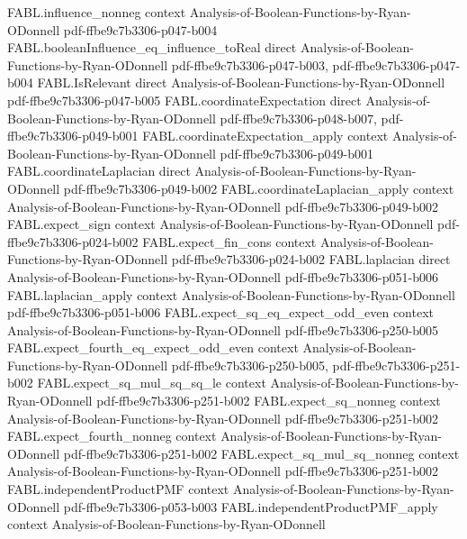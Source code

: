 \begin{theorem}
  {FABL.influence_nonneg}
  {context}
  {Analysis-of-Boolean-Functions-by-Ryan-ODonnell}
  {pdf-ffbe9c7b3306-p047-b004}
\proofstep
  {FABL.booleanInfluence_eq_influence_toReal}
  {direct}
  {Analysis-of-Boolean-Functions-by-Ryan-ODonnell}
  {pdf-ffbe9c7b3306-p047-b003,
    pdf-ffbe9c7b3306-p047-b004}
\proofstep
  {FABL.IsRelevant}
  {direct}
  {Analysis-of-Boolean-Functions-by-Ryan-ODonnell}
  {pdf-ffbe9c7b3306-p047-b005}
\proofstep
  {FABL.coordinateExpectation}
  {direct}
  {Analysis-of-Boolean-Functions-by-Ryan-ODonnell}
  {pdf-ffbe9c7b3306-p048-b007,
    pdf-ffbe9c7b3306-p049-b001}
\proofstep
  {FABL.coordinateExpectation_apply}
  {context}
  {Analysis-of-Boolean-Functions-by-Ryan-ODonnell}
  {pdf-ffbe9c7b3306-p049-b001}
\proofstep
  {FABL.coordinateLaplacian}
  {direct}
  {Analysis-of-Boolean-Functions-by-Ryan-ODonnell}
  {pdf-ffbe9c7b3306-p049-b002}
\proofstep
  {FABL.coordinateLaplacian_apply}
  {context}
  {Analysis-of-Boolean-Functions-by-Ryan-ODonnell}
  {pdf-ffbe9c7b3306-p049-b002}
\proofstep
  {FABL.expect_sign}
  {context}
  {Analysis-of-Boolean-Functions-by-Ryan-ODonnell}
  {pdf-ffbe9c7b3306-p024-b002}
\proofstep
  {FABL.expect_fin_cons}
  {context}
  {Analysis-of-Boolean-Functions-by-Ryan-ODonnell}
  {pdf-ffbe9c7b3306-p024-b002}
\proofstep
  {FABL.laplacian}
  {direct}
  {Analysis-of-Boolean-Functions-by-Ryan-ODonnell}
  {pdf-ffbe9c7b3306-p051-b006}
\proofstep
  {FABL.laplacian_apply}
  {context}
  {Analysis-of-Boolean-Functions-by-Ryan-ODonnell}
  {pdf-ffbe9c7b3306-p051-b006}
\proofstep
  {FABL.expect_sq_eq_expect_odd_even}
  {context}
  {Analysis-of-Boolean-Functions-by-Ryan-ODonnell}
  {pdf-ffbe9c7b3306-p250-b005}
\proofstep
  {FABL.expect_fourth_eq_expect_odd_even}
  {context}
  {Analysis-of-Boolean-Functions-by-Ryan-ODonnell}
  {pdf-ffbe9c7b3306-p250-b005,
    pdf-ffbe9c7b3306-p251-b002}
\proofstep
  {FABL.expect_sq_mul_sq_sq_le}
  {context}
  {Analysis-of-Boolean-Functions-by-Ryan-ODonnell}
  {pdf-ffbe9c7b3306-p251-b002}
\proofstep
  {FABL.expect_sq_nonneg}
  {context}
  {Analysis-of-Boolean-Functions-by-Ryan-ODonnell}
  {pdf-ffbe9c7b3306-p251-b002}
\proofstep
  {FABL.expect_fourth_nonneg}
  {context}
  {Analysis-of-Boolean-Functions-by-Ryan-ODonnell}
  {pdf-ffbe9c7b3306-p251-b002}
\proofstep
  {FABL.expect_sq_mul_sq_nonneg}
  {context}
  {Analysis-of-Boolean-Functions-by-Ryan-ODonnell}
  {pdf-ffbe9c7b3306-p251-b002}
\proofstep
  {FABL.independentProductPMF}
  {context}
  {Analysis-of-Boolean-Functions-by-Ryan-ODonnell}
  {pdf-ffbe9c7b3306-p053-b003}
\proofstep
  {FABL.independentProductPMF_apply}
  {context}
  {Analysis-of-Boolean-Functions-by-Ryan-ODonnell}

\end{theorem}
